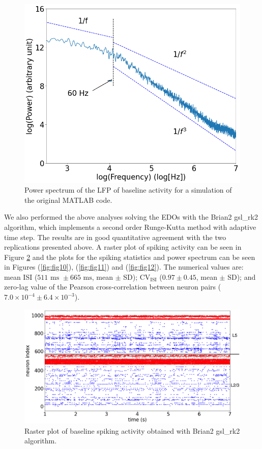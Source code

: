 \begin{figure}[H]
    \centering
    \includegraphics[scale=0.3]{Figures/Fig8.png}
    \caption{Power spectrum of the LFP of baseline activity for a simulation of the original MATLAB code.}
    \label{fig:fig8}
\end{figure}

We also performed the above analyses solving the EDOs with the Brian2 gsl\_rk2 algorithm, which implements a second order Runge-Kutta method with adaptive time step. The results are in good quantitative agreement with the two replications presented above. A raster plot of spiking activity can be seen in Figure \ref{fig:fig9} and the plots for the spiking statistics and power spectrum can be seen in Figures (\ref{fig:fig10}), (\ref{fig:fig11}) and (\ref{fig:fig12}). The numerical values are: mean ISI ($511 \text{ ms } \pm 665 \text{ ms}$, mean $\pm$ SD); CV$_{\text{ISI}}$ ($0.97 \pm 0.45$, mean $\pm$ SD); and zero-lag value of the Pearson cross-correlation between neuron pairs ($7.0 \times 10^{-4} \pm 6.4 \times 10^{-3}$).\\ 

\begin{figure}[H]
    \centering
    \includegraphics[scale=0.3]{Figures/Fig9.png}
    \caption{Raster plot of baseline spiking activity obtained with Brian2 gsl\_rk2 algorithm.}
    \label{fig:fig9}
\end{figure}

